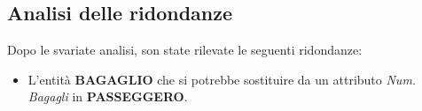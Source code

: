 
\newpage

\subsection{Analisi delle ridondanze}

\textsf{\small Dopo le svariate analisi, son state rilevate le seguenti ridondanze: }\break

\begin{itemize}
	\item \textsf{\small L'entità \textbf{BAGAGLIO} che si potrebbe sostituire da un attributo \emph{Num. Bagagli} in \textbf{PASSEGGERO}.}\\%
\end{itemize}


